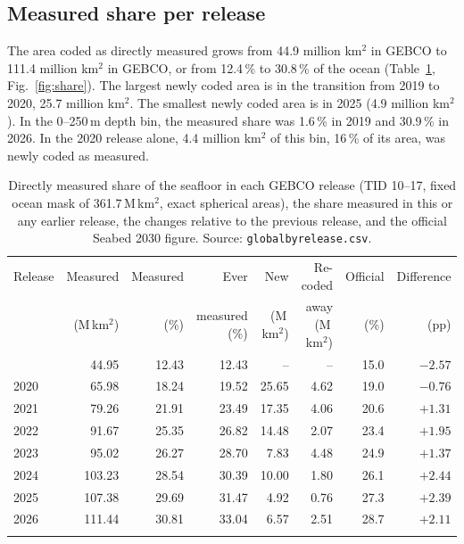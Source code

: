 \documentclass[essd, manuscript]{copernicus}
\newcommand{\Mkmsq}{M\,km$^{2}$}         %
\renewcommand{\_}{\usorig\allowbreak}
\begin{document}
\subsection{Measured share per release}

The area coded as directly measured grows from 44.9 million km$^2$ in GEBCO\_2019 to 111.4 million km$^2$ in GEBCO\_2026, or from 12.4\,\% to 30.8\,\% of the ocean (Table~\ref{tab:global}, Fig.~\ref{fig:share}).
The largest newly coded area is in the transition from 2019 to 2020, 25.7 million km$^2$.
The smallest newly coded area is in 2025 (4.9 million km$^2$).
In the 0--250\,m depth bin, the measured share was 1.6\,\% in 2019 and 30.9\,\% in 2026.
In the 2020 release alone, 4.4 million km$^2$ of this bin, 16\,\% of its area, was newly coded as measured.

\begin{table}[t]
\caption{Directly measured share of the seafloor in each GEBCO release (TID 10--17, fixed ocean mask of 361.7\,\Mkmsq, exact spherical areas), the share measured in this or any earlier release, the changes relative to the previous release, and the official Seabed 2030 figure. Source: \texttt{global\_by\_release.csv}.}
\label{tab:global}
\begin{tabular}{lrrrrrrr}
\tophline
Release & Measured & Measured & Ever & New & Re-coded & Official & Difference \\
 & (\Mkmsq) & (\%) & measured (\%) & (\Mkmsq) & away (\Mkmsq) & (\%) & (pp) \\
\middlehline
2019 & 44.95 & 12.43 & 12.43 & -- & -- & 15.0 & $-2.57$ \\
2020 & 65.98 & 18.24 & 19.52 & 25.65 & 4.62 & 19.0 & $-0.76$ \\
2021 & 79.26 & 21.91 & 23.49 & 17.35 & 4.06 & 20.6 & $+1.31$ \\
2022 & 91.67 & 25.35 & 26.82 & 14.48 & 2.07 & 23.4 & $+1.95$ \\
2023 & 95.02 & 26.27 & 28.70 & 7.83 & 4.48 & 24.9 & $+1.37$ \\
2024 & 103.23 & 28.54 & 30.39 & 10.00 & 1.80 & 26.1 & $+2.44$ \\
2025 & 107.38 & 29.69 & 31.47 & 4.92 & 0.76 & 27.3 & $+2.39$ \\
2026 & 111.44 & 30.81 & 33.04 & 6.57 & 2.51 & 28.7 & $+2.11$ \\
\bottomhline
\end{tabular}
\end{table}
\end{document}
